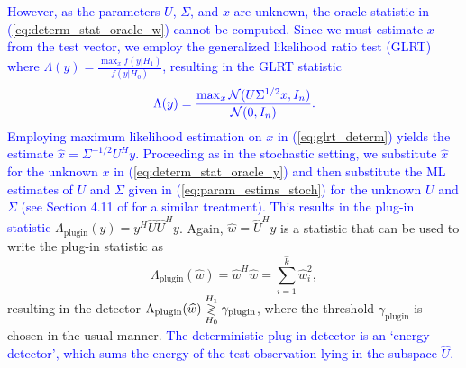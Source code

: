 \textcolor{blue}{However, as the parameters $U$, $\Sigma$, and $x$  are unknown, the oracle statistic in (\ref{eq:determ_stat_oracle_w}) cannot be computed. Since we must estimate $x$ from the test vector, we employ the generalized likelihood ratio test (GLRT) where $\Lambda(y) = \frac{\max_x f(y|H_1)}{f(y|H_0)}$, resulting in the GLRT statistic
\begin{equation}\label{eq:glrt_determ}
\textcolor{blue}{\Lambda(y)=\frac{\max_x\mathcal{N}(U\Sigma^{1/2} x,I_n)}{\mathcal{N}(0,I_n)}.}
\end{equation}
Employing maximum likelihood estimation on $x$ in (\ref{eq:glrt_determ}) yields the estimate $\widehat{x}=\Sigma^{-1/2}U^Hy$.  Proceeding as in the stochastic setting, we substitute $\widehat{x}$ for the unknown $x$ in (\ref{eq:determ_stat_oracle_y}) and then substitute the ML estimates of $U$ and $\Sigma$ given in (\ref{eq:param_estims_stoch}) for the unknown $U$ and $\Sigma$ (see Section 4.11 of \cite{scharf1991statistical} for a similar treatment). This results in the plug-in statistic} $\Lambda_{\text{plugin}}(y) = y^H\widehat{U}\widehat{U}^Hy$. Again, $\widehat{w}=\widehat{U}^Hy$ is a statistic that can be used to write the plug-in statistic as
\begin{equation}\label{eq:plugin_stat_determ}
\boxed{\Lambda_{\text{plugin}}(\widehat{w}) = \widehat{w}^H\widehat{w}=\sum_{i=1}^{\widehat{k}}\widehat{w}_i^2},
\end{equation}
resulting in the detector $\Lambda_{\text{plugin}}(\widehat{w}) \overset{H_1}{\underset{H_0}{\gtrless}} \gamma_{\text{plugin}}$, 
where the threshold $\gamma_{\text{plugin}}$ is chosen in the usual manner. \textcolor{blue}{The deterministic plug-in detector is an `energy detector', which sums the energy of the test observation lying in the subspace $\widehat{U}$.}

